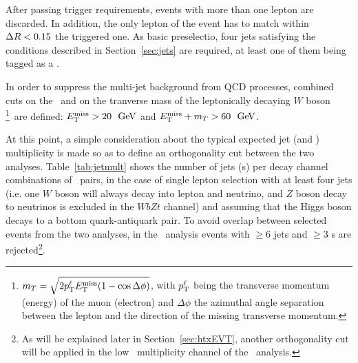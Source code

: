 After passing trigger requirements, events with more than one lepton are
discarded. In addition, the only lepton of the event has to match within $\dr<0.15$ the
triggered one. As basic preselectio, four jets satisfying the conditions
described in Section~\ref{sec:jets} are required, at least one of them
being tagged as a \bjet.

In order to suppress the multi-jet background from QCD processes,
combined cuts on the \met\ and on the tranverse mass of the 
leptonically decaying $W$ boson \mt\footnote{$\mt = \sqrt{2 p^\ell_{\rm T} \met (1-\cos\Delta\phi)}$, with
$p^\ell_{\rm T}$  being the transverse momentum (energy) of the muon (electron) and $\Delta\phi$ the
azimuthal angle separation between the lepton and the direction of
the missing transverse momentum.}\ 
are defined: $\met>20~\gev$ and $\met+\mt>60~\gev$.

At this point, a simple consideration about the typical expected jet
(and \bjet) multiplicity is made so as to define an orthogonality
cut between the two analyses. Table~\ref{tab:jetmult} shows the 
number of jets (\bjet s) per decay channel combinations of \TTbar\ pairs, 
in the case of single lepton selection with at least four jets
(i.e. one $W$ boson will always decay into lepton and neutrino,
and $Z$ boson decay to neutrinos is excluded in the $WbZt$ channel) and assuming that
the Higgs boson decays to a bottom quark-antiquark pair.
To avoid overlap between selected events from the two analyses, in the
\wbx\ analysis events with $\geq$6 jets and $\geq$3 \bjet s are 
rejected\footnote{As will be explained later in Section~\ref{sec:htxEVT}, another orthogonality
cut will be applied in the low \bjet\ multiplicity channel of the \htx\ analysis.}.

